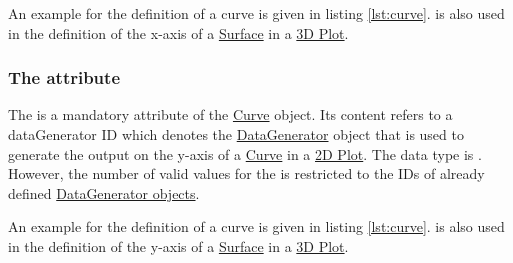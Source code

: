 An example for the definition of a curve is given in listing \ref{lst:curve}.
 is also used in the definition of the x-axis of a \hyperref[class:surface]{Surface} in a \hyperref[class:plot3D]{3D Plot}.

\subsubsection{The  attribute}
\label{sec:yDataReference}
The  is a mandatory attribute of the \hyperref[class:curve]{Curve} object. Its content refers to a dataGenerator ID which denotes the \hyperref[class:dataGenerator]{DataGenerator} object that is used to generate the output on the y-axis of a \hyperref[class:curve]{Curve} in a \hyperref[class:plot2D]{2D Plot}.
The  data type is . However, the number of valid values for the  is restricted to the IDs of already defined \hyperref[class:dataGenerator]{DataGenerator objects}.

An example for the definition of a curve is given in listing \ref{lst:curve}.
 is also used in the definition of the y-axis of a \hyperref[class:surface]{Surface} in a \hyperref[class:plot3D]{3D Plot}.

